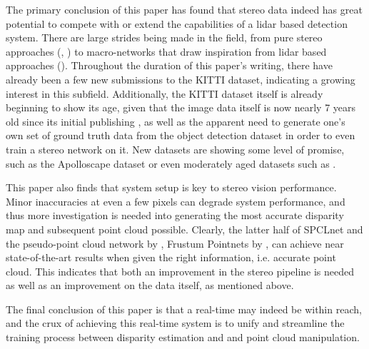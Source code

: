 The primary conclusion of this paper has found that stereo data indeed has great potential to compete with or extend the capabilities of a lidar based detection system. There are large strides being made in the field, from pure stereo approaches (\cite{zeng2018rt3d}, \cite{li_stereo_2019}) to macro-networks that draw inspiration from lidar based approaches (\cite{wang_pseudo-lidar_2019}). Throughout the duration of this paper's writing, there have already been a few new submissions to the KITTI dataset, indicating a growing interest in this subfield. Additionally, the KITTI dataset itself is already beginning to show its age, given that the image data itself is now nearly 7 years old since its initial publishing \cite{geiger_are_2012}, as well as the apparent need to generate one's own set of ground truth data from the object detection dataset in order to even train a stereo network on it. New datasets are showing some level of promise, such as the Apolloscape dataset \cite{huang_apolloscape_2018} or even moderately aged datasets such as \cite{cordts_cityscapes_2016}.

This paper also finds that system setup is key to stereo vision performance. Minor inaccuracies at even a few pixels can degrade system performance, and thus more investigation is needed into generating the most accurate disparity map and subsequent point cloud possible. Clearly, the latter half of SPCLnet and the pseudo-point cloud network by \cite{wang_pseudo-lidar_2019}, Frustum Pointnets by \cite{qi_frustum_2017}, can achieve near state-of-the-art results when given the right information, i.e. accurate point cloud. This indicates that both an improvement in the stereo pipeline is needed as well as an improvement on the data itself, as mentioned above.

The final conclusion of this paper is that a real-time may indeed be within reach, and the crux of achieving this real-time system is to unify and streamline the training process between disparity estimation and and point cloud manipulation. 






